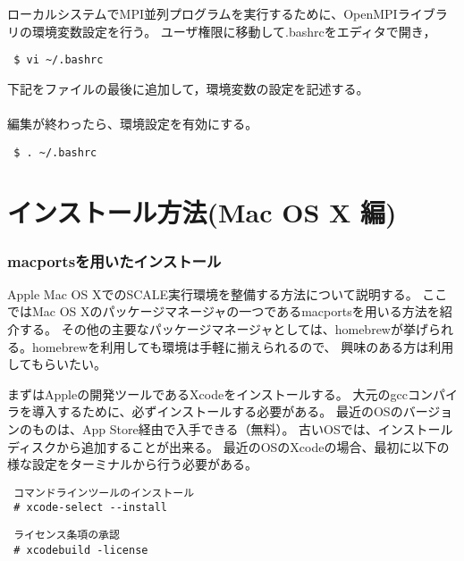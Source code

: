 ローカルシステムでMPI並列プログラムを実行するために、OpenMPIライブラリの環境変数設定を行う。
ユーザ権限に移動して.bashrcをエディタで開き，
\begin{verbatim}
 $ vi ~/.bashrc
\end{verbatim}
下記をファイルの最後に追加して，環境変数の設定を記述する。\\

\\

編集が終わったら、環境設定を有効にする。
\begin{verbatim}
 $ . ~/.bashrc
\end{verbatim}


\section{インストール方法(Mac OS X 編)} \label{chap:install_mac}

\subsubsection{macportsを用いたインストール}

Apple Mac OS XでのSCALE実行環境を整備する方法について説明する。
ここではMac OS Xのパッケージマネージャの一つであるmacportsを用いる方法を紹介する。
その他の主要なパッケージマネージャとしては、homebrewが挙げられる。homebrewを利用しても環境は手軽に揃えられるので、
興味のある方は利用してもらいたい。

まずはAppleの開発ツールであるXcodeをインストールする。
大元のgccコンパイラを導入するために、必ずインストールする必要がある。
最近のOSのバージョンのものは、App Store経由で入手できる（無料）。
古いOSでは、インストールディスクから追加することが出来る。
最近のOSのXcodeの場合、最初に以下の様な設定をターミナルから行う必要がある。
\begin{verbatim}
 コマンドラインツールのインストール
 # xcode-select --install
\end{verbatim}
\begin{verbatim}
 ライセンス条項の承認
 # xcodebuild -license
\end{verbatim}

